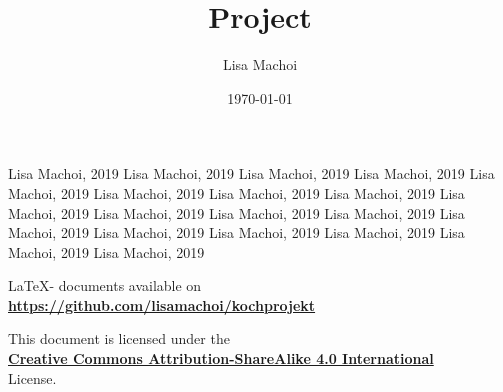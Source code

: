 \documentclass[10pt,a4paper]{article}
\begin{document}
\thispagestyle{empty}
\title{Project}
\author{Lisa Machoi}
\date{\today}
\maketitle
\newpage
\thispagestyle{empty}
\tableofcontents
\setcounter{page}{0}
%
\newpage
\setcounter{page}{1}



















\newpage
\renewcommand{\refname}{\textsc{References:}}
\begin{thebibliography}{9}
	 Lisa Machoi, 2019
	 Lisa Machoi, 2019
	 Lisa Machoi, 2019
	 Lisa Machoi, 2019
	 Lisa Machoi, 2019
	 Lisa Machoi, 2019
	 Lisa Machoi, 2019
	 Lisa Machoi, 2019
	 Lisa Machoi, 2019
	 Lisa Machoi, 2019
	 Lisa Machoi, 2019
	 Lisa Machoi, 2019
	 Lisa Machoi, 2019
	 Lisa Machoi, 2019
	 Lisa Machoi, 2019
	 Lisa Machoi, 2019
	 Lisa Machoi, 2019
	 Lisa Machoi, 2019
\end{thebibliography}
\vspace{2cm}
\begin{center}
	\LaTeX - documents available on\\ \href{https://github.com/lisamachoi/kochprojekt}{\textbf{https://github.com/lisamachoi/kochprojekt}}
	
	\vspace{2cm}
	
	This document is licensed under the\\ \href{https://creativecommons.org/licenses/by-sa/4.0/}{\textbf{Creative Commons Attribution-ShareAlike 4.0 International}}\\
	License.

	\vspace{1cm}

	{\huge\ccbysa}
\end{center}
\end{document}
